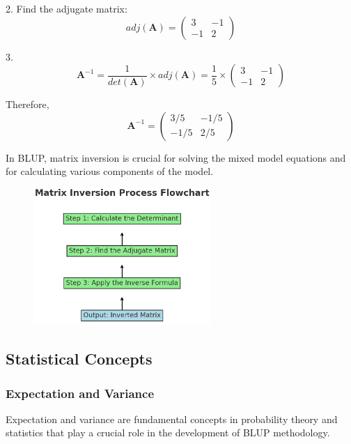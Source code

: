 \documentclass[12pt,a4paper]{article}
\begin{document}
2. Find the adjugate matrix: $$adj(\mathbf{A}) = \begin{pmatrix} 3 & -1 \\ -1 & 2 \end{pmatrix}$$

3. $$\mathbf{A}^{-1} = \frac{1}{det(\mathbf{A})} \times adj(\mathbf{A}) = \frac{1}{5} \times \begin{pmatrix} 3 & -1 \\ -1 & 2 \end{pmatrix}$$

Therefore, $$\mathbf{A}^{-1} = \begin{pmatrix} 3/5 & -1/5 \\ -1/5 & 2/5 \end{pmatrix}$$

In BLUP, matrix inversion is crucial for solving the mixed model equations and for calculating various components of the model.

\begin{figure}[h] %
    \centering
    \includegraphics[width=0.6\textwidth]{matrixInv_FC.jpg} %
    \label{fig:Inverse of a Matrix} %
\end{figure}

\subsection{Statistical Concepts}

\subsubsection{Expectation and Variance}

Expectation and variance are fundamental concepts in probability theory and statistics that play a crucial role in the development of BLUP methodology.
\end{document}
